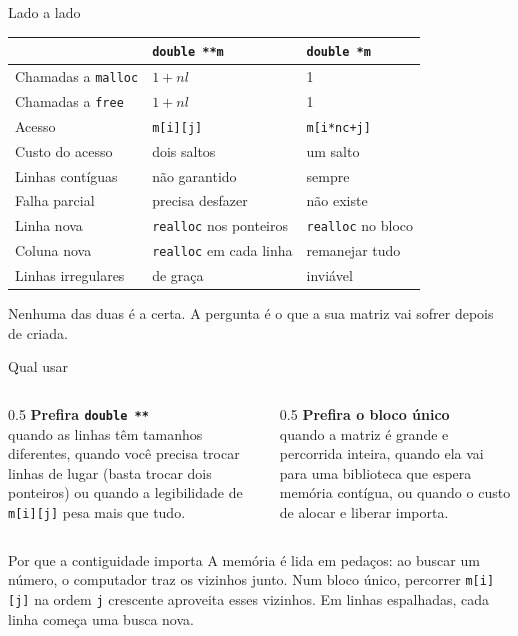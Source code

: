 \documentclass[aspectratio=169]{beamer}
\begin{document}
\begin{frame}{Lado a lado}
  \begin{center}
  \footnotesize
  \begin{tabular}{@{}lll@{}}
    \toprule
    & \textbf{\texttt{double **m}} & \textbf{\texttt{double *m}} \\
    \midrule
    Chamadas a \texttt{malloc} & $1 + nl$            & 1 \\
    Chamadas a \texttt{free}   & $1 + nl$            & 1 \\
    Acesso                     & \texttt{m[i][j]}    & \texttt{m[i*nc+j]} \\
    Custo do acesso            & dois saltos         & um salto \\
    Linhas contíguas           & não garantido       & sempre \\
    Falha parcial              & precisa desfazer    & não existe \\
    Linha nova                 & \texttt{realloc} nos ponteiros & \texttt{realloc} no bloco \\
    Coluna nova                & \texttt{realloc} em cada linha & remanejar tudo \\
    Linhas irregulares         & de graça            & inviável \\
    \bottomrule
  \end{tabular}
  \end{center}
  \begin{block}{}
    \small Nenhuma das duas é a certa. A pergunta é o que a sua matriz vai
    sofrer depois de criada.
  \end{block}
\end{frame}

\begin{frame}{Qual usar}
  \begin{columns}[T]
    \begin{column}{0.5\textwidth}
      \textbf{Prefira \texttt{double **}}\\[0.3em]
      quando as linhas têm tamanhos diferentes, quando você precisa trocar
      linhas de lugar (basta trocar dois ponteiros) ou quando a legibilidade de
      \texttt{m[i][j]} pesa mais que tudo.
    \end{column}
    \begin{column}{0.5\textwidth}
      \textbf{Prefira o bloco único}\\[0.3em]
      quando a matriz é grande e percorrida inteira, quando ela vai para uma
      biblioteca que espera memória contígua, ou quando o custo de alocar e
      liberar importa.
    \end{column}
  \end{columns}
  \begin{block}{Por que a contiguidade importa}
    A memória é lida em pedaços: ao buscar um número, o computador traz os
    vizinhos junto. Num bloco único, percorrer \texttt{m[i][j]} na ordem
    \texttt{j} crescente aproveita esses vizinhos. Em linhas espalhadas, cada
    linha começa uma busca nova.
  \end{block}
\end{frame}
\end{document}

